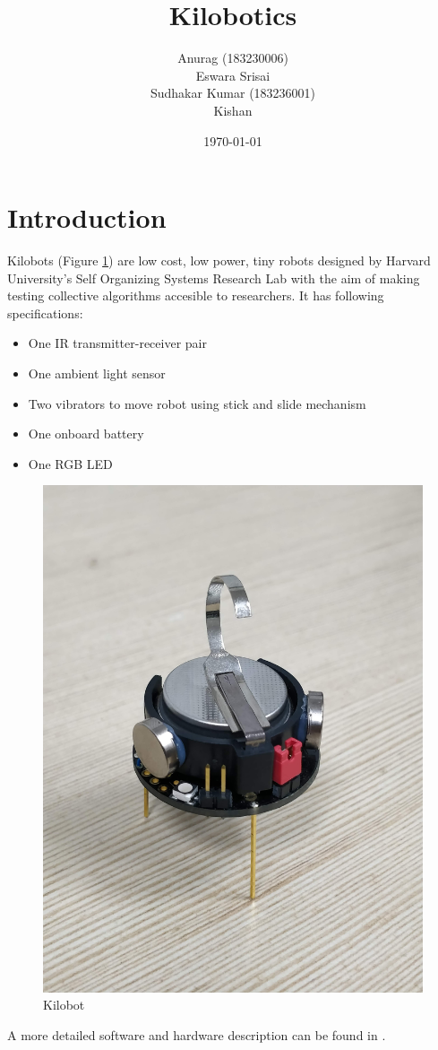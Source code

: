 \documentclass{article}
\title{Kilobotics}
\author{Anurag (183230006)\\ Eswara Srisai \\ Sudhakar Kumar (183236001) \\ Kishan}
\date{\today}
\begin{document}
\maketitle

\section{Introduction}
Kilobots (Figure \ref{fig:kilobot}) are low cost, low power, tiny robots designed by Harvard University's Self Organizing Systems Research Lab with the aim of making testing collective algorithms accesible to researchers. It has following specifications:
\begin{itemize}
	\item One IR transmitter-receiver pair
	\item One ambient light sensor
	\item Two vibrators to move robot using stick and slide mechanism
	\item One onboard battery
	\item One RGB LED
\end{itemize}
\begin{figure}[H]
	\centering
	\includegraphics[scale=0.04]{images/kilobots}
	\caption{Kilobot}
    \label{fig:kilobot}
\end{figure}
A more detailed software and hardware description can be found in \cite{kilobotics_manual}.
\end{document}
